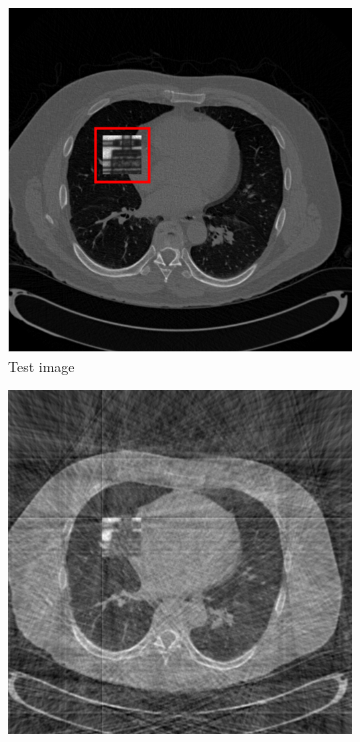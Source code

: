 \documentclass{article}
\begin{document}

\newpage
\begin{figure}[h]
    \begin{subfigure}[b]{0.3\linewidth}
        \includegraphics[width=\textwidth]{../images/supplementary/colon/testIm.png}
        \caption{Test image}
     \end{subfigure}
    \begin{subfigure}[b]{0.3\linewidth}
        \includegraphics[width=\textwidth]{../images/supplementary/colon/60_angles/fbp.png}

\end{subfigure}
\end{figure}
\end{document}

